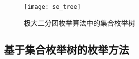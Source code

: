 
\begin{figure} [ht]
  \centering
  \vspace{0.3 in}
  \texttt{[image: se\_tree]}
  \vspace{0.3 in}
  \caption{极大二分团枚举算法中的集合枚举树}
  \label{fig:se}
\end{figure}

\subsection{基于集合枚举树的枚举方法}

